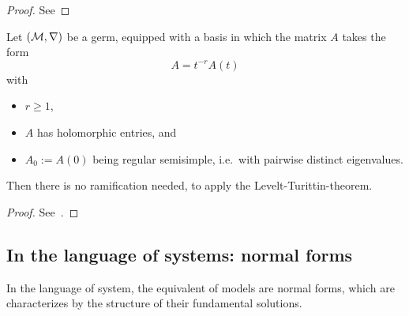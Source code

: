 \begin{proof}
  See \TODO{}
\end{proof}
\begin{prop}
  Let $(\mathcal{M},\nabla)$ be a germ, equipped with a basis in which the matrix $A$
  takes the form
  \[
    A=t^{-r}A(t)
  \]
  with
  \begin{itemize}
    \item $r\geq1$,
    \item $A$ has holomorphic entries, and
    \item $A_0:=A(0)$ being regular semisimple, i.e.\ with pairwise distinct
      eigenvalues.
  \end{itemize}
  Then there is no ramification needed, to apply the Levelt-Turittin-theorem.
  \begin{comment}
    Further, all the summands $\cR_\phi$ have rank one, which is not the case
    in general.
  \end{comment}
\end{prop}
\begin{proof}
  See~\cite[Thm.II.5.7]{sabbah2007isomonodromic}.
\end{proof}

\subsection{In the language of systems: normal forms}
In the language of system, the equivalent of models are normal forms, which are
characterizes by the structure of their fundamental solutions.

